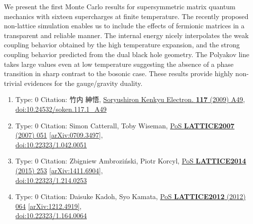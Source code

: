 \documentclass[a4paper,10pt]{article}
\begin{document}
\begin{enumerate}
We present the first Monte Carlo results for supersymmetric matrix quantum mechanics with sixteen supercharges at finite temperature. The recently proposed non-lattice simulation enables us to include the effects of fermionic matrices in a transparent and reliable manner. The internal energy nicely interpolates the weak coupling behavior obtained by the high temperature expansion, and the strong coupling behavior predicted from the dual black hole geometry. The Polyakov line takes large values even at low temperature suggesting the absence of a phase transition in sharp contrast to the bosonic case. These results provide highly non-trivial evidences for the gauge/gravity duality.
\begin{enumerate}
  \item Type: 0 Citation: 竹内 紳悟, \href{https://www.doi.org/10.24532/soken.117.1_A49}{Soryushiron Kenkyu Electron. {\bf 117} (2009) A49},\\\href{https://www.doi.org/10.24532/soken.117.1_A49}{doi:10.24532/soken.117.1\_A49}
  \item Type: 0 Citation: Simon Catterall, Toby Wiseman, \href{https://www.doi.org/10.22323/1.042.0051}{PoS {\bf LATTICE2007} (2007) 051}  \href{https://arxiv.org/abs/0709.3497}{[arXiv:0709.3497]},\\\href{https://www.doi.org/10.22323/1.042.0051}{doi:10.22323/1.042.0051}
  \item Type: 0 Citation: Zbigniew Ambroziński, Piotr Korcyl, \href{https://www.doi.org/10.22323/1.214.0253}{PoS {\bf LATTICE2014} (2015) 253}  \href{https://arxiv.org/abs/1411.6904}{[arXiv:1411.6904]},\\\href{https://www.doi.org/10.22323/1.214.0253}{doi:10.22323/1.214.0253}
  \item Type: 0 Citation: Daisuke Kadoh, Syo Kamata, \href{https://www.doi.org/10.22323/1.164.0064}{PoS {\bf LATTICE2012} (2012) 064}  \href{https://arxiv.org/abs/1212.4919}{[arXiv:1212.4919]},\\\href{https://www.doi.org/10.22323/1.164.0064}{doi:10.22323/1.164.0064}

\end{enumerate}
\end{enumerate}
\end{document}

